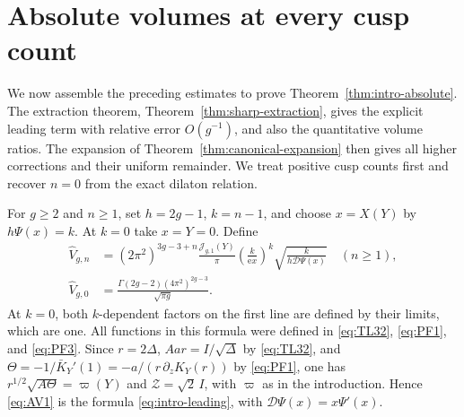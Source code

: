 \section{Absolute volumes at every cusp count}\label{sec:absolute}

We now assemble the preceding estimates to prove Theorem~\ref{thm:intro-absolute}. The extraction theorem, Theorem~\ref{thm:sharp-extraction}, gives the explicit leading term with relative error $O(g^{-1})$, and also the quantitative volume ratios. The expansion of Theorem~\ref{thm:canonical-expansion} then gives all higher corrections and their uniform remainder. We treat positive cusp counts first and recover $n=0$ from the exact dilaton relation.

For $g\ge2$ and $n\ge1$, set $h=2g-1$, $k=n-1$, and choose $x=X(Y)$
by $h\Psi(x)=k$. At $k=0$ take $x=Y=0$. Define
\begin{equation}
 \begin{split}
 \widehat V_{g,n}&=
 (2\pi^2)^{3g-3+n}\frac{\mathcal J_{g,1}(Y)}{\pi}
 \left(\frac{k}{\mathrm{e} x}\right)^k
 \sqrt{\frac{k}{h\mathscr D\Psi(x)}}\quad(n\ge1),\\
 \widehat V_{g,0}&=
 \frac{\Gamma(2g-2)(4\pi^2)^{2g-3}}{\sqrt{\pi g}}.
 \end{split}
 \label{eq:AV1}
\end{equation}
At $k=0$, both $k$-dependent factors on the first line are defined by
their limits, which are one. All functions in this formula were defined
in \eqref{eq:TL32}, \eqref{eq:PF1}, and \eqref{eq:PF3}.
Since $r=2\Delta$, $Aar=I/\sqrt\Delta$ by \eqref{eq:TL32}, and
$\Theta=-1/\bar K_Y'(1)=-a/(r\,\partial_zK_Y(r))$ by \eqref{eq:PF1}, one has
$r^{1/2}\sqrt{A\Theta}=\varpi(Y)$ and $\mathcal Z=\sqrt2\,I$, with
$\varpi$ as in the introduction. Hence \eqref{eq:AV1} is the formula
\eqref{eq:intro-leading}, with $\mathscr D\Psi(x)=x\Psi'(x)$.

